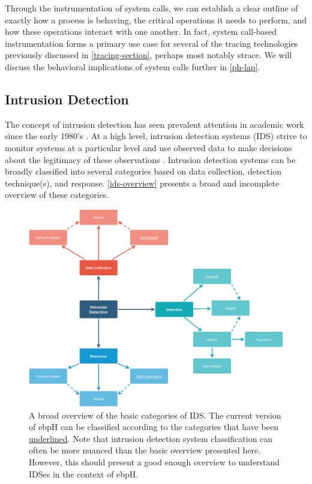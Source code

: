 \documentclass[
  12pt]{findlay}
\begin{document}
Through the instrumentation of system calls, we can establish a clear
outline of exactly how a process is behaving, the critical operations it
needs to perform, and how these operations interact with one another. In
fact, system call-based instrumentation forms a primary use case for
several of the tracing technologies previously discussed in
\autoref{tracing-section}, perhaps most notably strace. We will discuss
the behavioral implications of system calls further in \autoref{ph-lap}.

\hypertarget{intrusion-detection}{%
\subsection{Intrusion Detection}\label{intrusion-detection}}

The concept of intrusion detection has seen prevalent attention in
academic work since the early 1980's
\autocite{anderson80,denning85,denning87}. At a high level, intrusion
detection systems (IDS) strive to monitor systems at a particular level
and use observed data to make decisions about the legitimacy of these
observations \autocite{kemmerer02}. Intrusion detection systems can be
broadly classified into several categories based on data collection,
detection technique(s), and response. \autoref{ids-overview} presents a
broad and incomplete overview of these categories.

\begin{figure}[p]
    \caption[An overview of the basic categories of IDS]{
        A broad overview of the basic categories of IDS.
        The current version of ebpH can be classified according to the
        categories that have been \underline{underlined}. Note that intrusion detection
        system classification can often be more nuanced than the basic overview presented
        here. However, this should present a good enough overview to understand IDSes in
        the context of ebpH.
    }
    \label{ids-overview}
    \includegraphics{../figures/ids-overview.png}
\end{figure}
\end{document}
